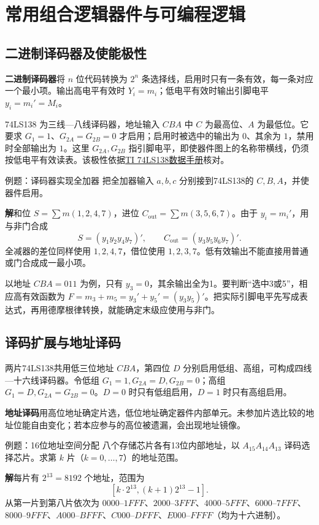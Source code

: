\documentclass[UTF8,fontset=none,zihao=-4,a4paper]{ctexart}
\newcommand{\chapterpage}[1]{\clearpage\section{#1}}
\newcommand{\term}[1]{\textbf{#1}}
\newcommand{\sol}{\par\noindent\textbf{解}\quad}
\begin{document}
\chapterpage{常用组合逻辑器件与可编程逻辑}
\subsection{二进制译码器及使能极性}
\term{二进制译码器}将 $n$ 位代码转换为 $2^n$ 条选择线，启用时只有一条有效，每一条对应一个最小项。输出高电平有效时 $Y_i=m_i$；低电平有效时输出引脚电平 $y_i=m_i'=M_i$。

74LS138 为三线—八线译码器，地址输入 $CBA$ 中 $C$ 为最高位、$A$ 为最低位。它要求 $G_1=1$、$G_{2A}=G_{2B}=0$ 才启用；启用时被选中的输出为 $0$、其余为 $1$，禁用时全部输出为 $1$。这里 $G_{2A},G_{2B}$ 指引脚电平，即使器件图上的名称带横线，仍须按低电平有效读表。该极性依据\href{https://www.ti.com/lit/ds/symlink/sn74ls138.pdf}{TI 74LS138数据手册}核对。

\begin{infobox}{例题：译码器实现全加器}
把全加器输入 $a,b,c$ 分别接到74LS138的 $C,B,A$，并使器件启用。
\end{infobox}
\sol 和位 $S=\sum m(1,2,4,7)$，进位 $C_{\mathrm{out}}=\sum m(3,5,6,7)$。由于 $y_i=m_i'$，用与非门合成
\[
S=(y_1y_2y_4y_7)',\qquad C_{\mathrm{out}}=(y_3y_5y_6y_7)'.
\]
全减器的差位同样使用 $1,2,4,7$，借位使用 $1,2,3,7$。低有效输出不能直接用普通或门合成成一最小项。

以地址 $CBA=011$ 为例，只有 $y_3=0$，其余输出全为1。要判断“选中3或5”，相应高有效函数为 $F=m_3+m_5=y_3'+y_5'=(y_3y_5)'$。把实际引脚电平先写成表达式，再用德摩根律转换，就能确定末级应使用与非门。

\subsection{译码扩展与地址译码}
两片74LS138共用低三位地址 $CBA$，第四位 $D$ 分别启用低组、高组，可构成四线—十六线译码器。令低组 $G_1=1,G_{2A}=D,G_{2B}=0$；高组 $G_1=D,G_{2A}=G_{2B}=0$。$D=0$ 时只有低组启用，$D=1$ 时只有高组启用。

\term{地址译码}用高位地址确定片选，低位地址确定器件内部单元。未参加片选比较的地址位能自由变化；若本应参与的高位被遗漏，会出现地址镜像。
\begin{infobox}{例题：16位地址空间分配}
八个存储芯片各有13位内部地址，以 $A_{15}A_{14}A_{13}$ 译码选择芯片。求第 $k$ 片（$k=0,\ldots,7$）的地址范围。
\end{infobox}
\sol 每片有 $2^{13}=8192$ 个地址，范围为
\[
[k\cdot2^{13},(k+1)2^{13}-1].
\]
从第一片到第八片依次为 $0000$--$1FFF$、$2000$--$3FFF$、$4000$--$5FFF$、$6000$--$7FFF$、$8000$--$9FFF$、$A000$--$BFFF$、$C000$--$DFFF$、$E000$--$FFFF$（均为十六进制）。
\end{document}
